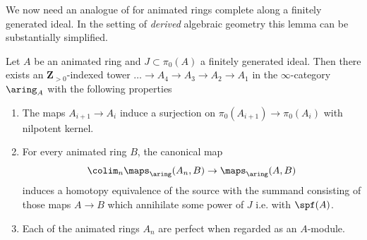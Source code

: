 \documentclass[10pt,reqno]{amsart}
\numberwithin{equation}{section}
\begin{document}
We now need an analogue of \cite[Lemma 8.1.2.2]{Lur18} for animated rings complete along a finitely generated ideal. In the setting of \emph{derived} algebraic geometry this lemma can be substantially simplified.

\begin{lemma}[\label{lem: luries lemma on spf}]
Let $A$ be an animated ring and $J\subset \pi_0(A)$ a finitely generated ideal. Then there exists an $\mathbf{Z}_{>0}$-indexed tower $\ldots \to A_4\to A_3\to A_2\to A_1$ in the $\infty$-category $\aring_A$ with the following properties
    \begin{enumerate}
        \item The maps $A_{i+1}\to A_i$ induce a surjection on $\pi_0(A_{i+1})\to \pi_0(A_i)$ with nilpotent kernel.
        \item For every animated ring $B$, the canonical map $$\colim_n\maps_{\aring}(A_n,B)\to \maps_{\aring}(A,B) $$ induces a homotopy equivalence of the source with the summand consisting of those maps $A\to B$ which annihilate some power of $J$ i.e. with $\spf (A)$.
        \item Each of the animated rings $A_n$ are perfect when regarded as an $A$-module.
    \end{enumerate}
\end{lemma}
\end{document}

